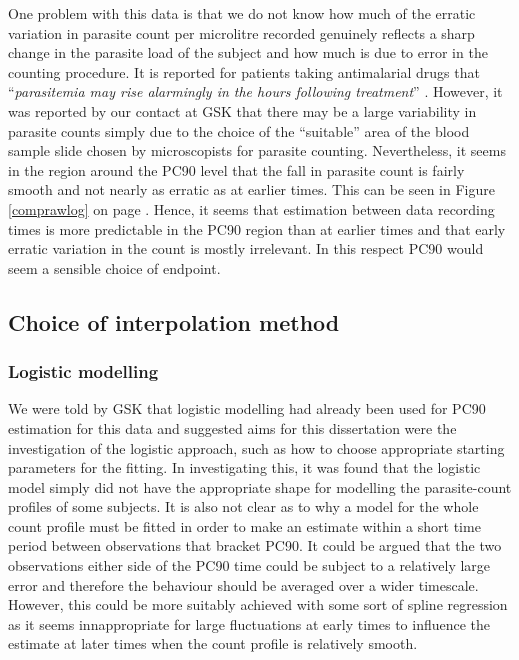 One problem with this data is that we do not know how much of the erratic variation in parasite count per microlitre recorded genuinely reflects a sharp change in the parasite load of the subject and how much is due to error in the counting procedure. It is reported for patients taking antimalarial drugs that ``\textit{parasitemia may rise alarmingly in the hours following treatment}'' \cite{white}. However, it was reported by our contact at GSK that there may be a large variability in parasite counts simply due to the choice of the ``suitable'' area of the blood sample slide chosen by microscopists for parasite counting. Nevertheless, it seems in the region around the PC90 level that the fall in parasite count is fairly smooth and not nearly as erratic as at earlier times. This can be seen in Figure \ref{comprawlog} on page \pageref{comprawlog}. Hence, it seems that estimation between data recording times is more predictable in the PC90 region than at earlier times and that early erratic variation in the count is mostly irrelevant. In this respect PC90 would seem a sensible choice of endpoint.

\subsection{Choice of interpolation method}
\subsubsection*{Logistic modelling}
We were told by GSK that logistic modelling had already been used for PC90 estimation for this data and suggested aims for this dissertation were the investigation of the logistic approach, such as how to choose appropriate starting parameters for the fitting. In investigating this, it was found that the logistic model simply did not have the appropriate shape for modelling the parasite-count profiles of some subjects. It is also not clear as to why a model for the whole count profile must be fitted in order to make an estimate within a short time period between observations that bracket PC90. It could be argued that the two observations either side of the PC90 time could be subject to a relatively large error and therefore the behaviour should be averaged over a wider timescale. However, this could be more suitably achieved with some sort of spline regression as it seems innappropriate for large fluctuations at early times to influence the estimate at later times when the count profile is relatively smooth.

